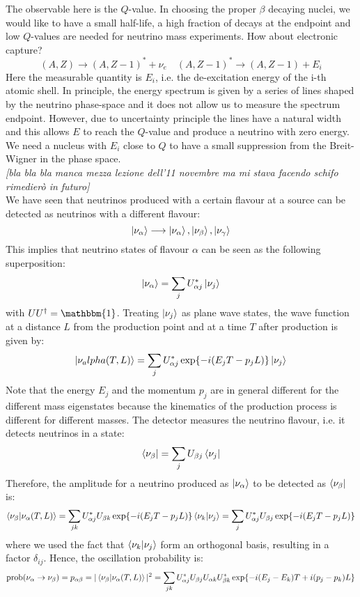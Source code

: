 \documentclass[10.75pt,a4paper,openright,bottom=2cm]{article}
\begin{document}
The observable here is the $Q$-value. In choosing the proper $\beta$ decaying nuclei, we would like to have a small half-life, a high fraction of decays at the endpoint and low $Q$-values are needed for neutrino mass experiments. How about electronic capture?
\[
(A,Z)\to(A,Z-1)^*+\nu_e \quad (A,Z-1)^*\to(A,Z-1)+E_i
\]
Here the measurable quantity is $E_i$, i.e. the de-excitation energy of the i-th atomic shell. In principle, the energy spectrum is given by a series of lines shaped by the neutrino phase-space and it does not allow us to measure the spectrum endpoint. However, due to uncertainty principle the lines have a natural width and this allows $E$ to reach the $Q$-value and produce a neutrino with zero energy. We need a nucleus with $E_i$ close to $Q$ to have a small suppression from the Breit-Wigner in the phase space.\\
\textit{[bla bla bla manca mezza lezione dell'11 novembre ma mi stava facendo schifo rimedierò in futuro]}\\
We have seen that neutrinos produced with a certain flavour at a source can be detected as neutrinos with a different flavour:
\[
\ket{\nu_\alpha}\longrightarrow\ket{\nu_\alpha},\ket{\nu_\beta},\ket{\nu_\gamma}
\]
This implies that neutrino states of flavour $\alpha$ can be seen as the following superposition:
\[
\ket{\nu_\alpha}=\sum_jU_{\alpha j}^*\ket{\nu_j}
\]
with $UU^\dagger=\mathbbm{1}$. Treating $\ket{\nu_j}$ as plane wave states, the wave function at a distance
$L$ from the production point and at a time $T$ after production is given by:
\[
\ket{\nu_alpha(T,L)}=\sum_jU^*_{\alpha j}\exp{-i(E_jT-p_jL)}\ket{\nu_j}
\]
Note that the energy $E_j$ and the momentum $p_j$ are in general different for the different
mass eigenstates because the kinematics of the production process is different for different
masses. The detector measures the neutrino flavour, i.e. it detects neutrinos in a state:
\[
\bra{\nu_\beta}=\sum_jU_{\beta j}\bra{\nu_j}
\]
Therefore, the amplitude for a neutrino produced as $\ket{\nu_\alpha}$ to be detected as $\bra{\nu_\beta}$ is:
\[
\braket{\nu_\beta}{\nu_\alpha(T,L)}=\sum_{jk}U_{\alpha j}^*U_{\beta k}\exp{-i(E_jT-p_jL)}\braket{\nu_k}{\nu_j}=\sum_jU_{\alpha j}^*U_{\beta j}\exp{-i(E_jT-p_jL)}
\]
where we used the fact that $\braket{\nu_k}{\nu_j}$ form an orthogonal basis, resulting in a factor $\delta_{ij}$. Hence, the oscillation probability is:
\[
\text{prob}(\nu_\alpha\to\nu_\beta)=p_{\alpha\beta}=|\braket{\nu_\beta}{\nu_\alpha(T,L)}|^2=\sum_{jk}U_{\alpha j}^*U_{\beta j}U_{\alpha k}U_{\beta k}^*\exp{-i(E_j-E_k)T+i(p_j-p_k)L}
\]
\end{document}
